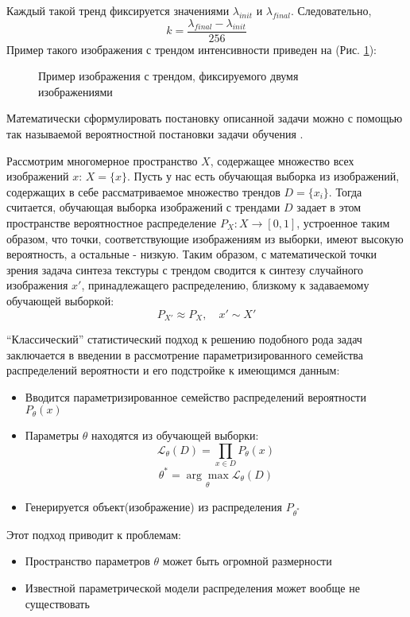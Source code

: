 	Каждый такой тренд фиксируется значениями $\lambda_{init}$ и $\lambda_{final}$. Следовательно, 
	$$k = \frac{\lambda_{final} - \lambda_{init}}{256}$$
	Пример такого изображения с трендом интенсивности приведен на (Рис. \ref{1-trend-example}):
	
	\begin{figure}[h]
		\caption{Пример изображения с трендом, фиксируемого двумя изображениями}
		\label{1-trend-example}
	\end{figure}
	
	Математически сформулировать постановку описанной задачи можно с помощью так называемой вероятностной постановки задачи обучения \cite{Voron-ML, GAN-original}.
	
	Рассмотрим многомерное пространство $X$, содержащее множество всех изображений $x$: $X = \{x\}$. Пусть у нас есть обучающая выборка из изображений, содержащих в себе рассматриваемое множество трендов $D = \{x_i\}$. Тогда считается, обучающая выборка изображений с трендами $D$ задает в этом пространстве вероятностное распределение $P_X : X \longrightarrow [0,1]$, устроенное таким образом, что точки, соответствующие изображениям из выборки, имеют высокую вероятность, а остальные - низкую. Таким образом, с математической точки зрения задача синтеза текстуры с трендом сводится к синтезу случайного изображения $x'$, принадлежащего распределению, близкому к задаваемому обучающей выборкой:
	$$ P_{X'} \approx P_X, \quad x' \sim X'$$
	
	``Классический'' статистический подход к решению подобного рода задач заключается в введении в рассмотрение параметризированного семейства распределений вероятности и его подстройке к имеющимся данным:
	
	\begin{itemize}
		\item Вводится параметризированное семейство распределений вероятности $P_{\theta}(x)$
		\item Параметры $\theta$ находятся из обучающей выборки:
		$$ \mathcal{L}_{\theta}(D) = \prod_{x \in D} P_{\theta}(x) $$
		$$ \theta^{*} = \underset{\theta}{\arg\max} \mathcal{L}_{\theta}(D)$$
		\item Генерируется объект(изображение) из распределения $ P_{\theta^{*}}$
	\end{itemize}
	
	Этот подход приводит к проблемам:
	
	\begin{itemize}
		\item Пространство параметров $\theta$ может быть огромной размерности
		\item Известной параметрической модели распределения может вообще не существовать
	\end{itemize}
	
